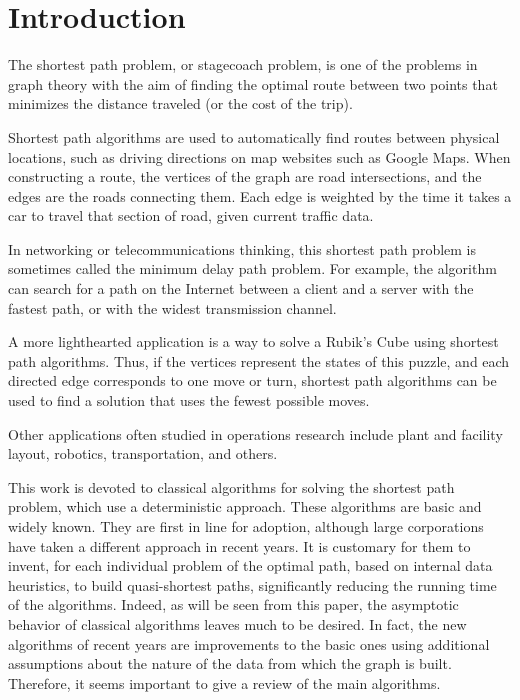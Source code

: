 

\usepackage[utf8]{inputenc}                %
\usepackage[british]{babel}  %
\usepackage[pdftex]{graphicx}              %

\setlength{\parindent}{0pt}
\setlength{\parskip}{1em}


    
    \tableofcontents
    \clearpage
    \section{Introduction}
    The shortest path problem, or stagecoach problem, is one of the problems in graph theory with the aim of finding the optimal route between two points that minimizes the distance traveled (or the cost of the trip).

    Shortest path algorithms are used to automatically find routes between physical locations, such as driving directions on map websites such as Google Maps. When constructing a route, the vertices of the graph are road intersections, and the edges are the roads connecting them. Each edge is weighted by the time it takes a car to travel that section of road, given current traffic data.

    In networking or telecommunications thinking, this shortest path problem is sometimes called the minimum delay path problem. For example, the algorithm can search for a path on the Internet between a client and a server with the fastest path, or with the widest transmission channel.

    A more lighthearted application is a way to solve a Rubik's Cube using shortest path algorithms. Thus, if the vertices represent the states of this puzzle, and each directed edge corresponds to one move or turn, shortest path algorithms can be used to find a solution that uses the fewest possible moves.

    Other applications often studied in operations research include plant and facility layout, robotics, transportation, and others.

    This work is devoted to classical algorithms for solving the shortest path problem, which use a deterministic approach.
    These algorithms are basic and widely known. They are first in line for adoption, although large corporations have taken a different approach in recent years.
    It is customary for them to invent, for each individual problem of the optimal path, based on internal data heuristics, to build quasi-shortest paths, significantly reducing the running time of the algorithms.
    Indeed, as will be seen from this paper, the asymptotic behavior of classical algorithms leaves much to be desired.
    In fact, the new algorithms of recent years are improvements to the basic ones using additional assumptions about the nature of the data from which the graph is built.
    Therefore, it seems important to give a review of the main algorithms.

